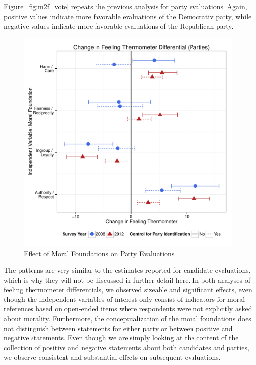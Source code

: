 \documentclass[12pt]{article}
\begin{document}
Figure~\ref{fig:m2f_vote} repeats the previous analysis for party evaluations. Again, positive values indicate more favorable evaluations of the Democrativ party, while negative values indicate more favorable evaluations of the Republican party.

\begin{figure}[ht]\centering
\includegraphics[scale=.5]{../calc/fig/m2f_vote.pdf}
\caption{Effect of Moral Foundations on Party Evaluations}\label{fig:m2g_vote}
\end{figure}

The patterns are very similar to the estimates reported for candidate evaluations, which is why they will not be discussed in further detail here. In both analyses of feeling thermometer differentials, we observed sizeable and significant effects, even though the independent variables of interest only consist of indicators for moral references based on open-ended items where respondents were not explicitly asked about morality. Furthermore, the conceptualization of the moral foundations does not distinguish between statements for either party or between positive and negative statements. Even though we are simply looking at the content of the collection of positive and negative statements about both candidates and parties, we observe consistent and substantial effects on subsequent evaluations.
\end{document}
